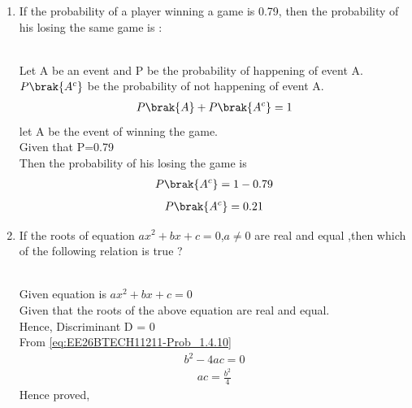 \begin{enumerate}[label=\thesubsection.\arabic*, ref=\thesubsection.\theenumi]
\item
If the probability of a player winning a game is 0.79, then the probability of his losing the same game is :
\begin{enumerate}
\end{enumerate}
\solution
\\Let A be an event and P be the probability of happening of event A.
$P\brak{A^c}$ be the probability of not happening of event A.
\begin{align}
P\brak{A} + P\brak{A^c} = 1
\end{align}
let A be the event of winning the game.
\\Given that P=0.79
\\Then the probability of his losing the game is
\begin{align}                
P\brak{A^c}=1-0.79
\end{align}
\begin{align}
P\brak{A^c} = 0.21
\end{align}
\item
 If the roots of equation $ax^2 + bx + c = 0$,$a \neq 0$ are real and equal ,then which of the following relation  is true ?                   
\begin{enumerate}
\end{enumerate}

\solution
\\Given equation is $ax^2 + bx + c = 0$
\\Given that the roots of the above equation are real and equal.
\\Hence, Discriminant D = 0
\\From \eqref{eq:EE26BTECH11211-Prob_1.4.10}
\begin{align}
b^2 - 4ac = 0\end{align}
\begin{align}
ac = \frac{b^2}{4}
\end{align}
Hence proved,


\end{enumerate}
